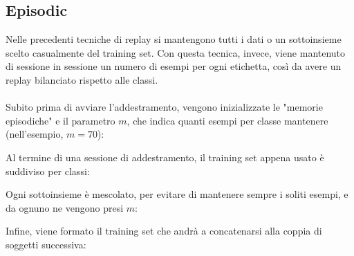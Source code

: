 \subsection{Episodic}  %
Nelle precedenti tecniche di replay si mantengono tutti i dati o un sottoinsieme scelto casualmente del training set. Con questa tecnica, invece, viene mantenuto di sessione in sessione un numero di esempi per ogni etichetta, così da avere un replay bilanciato rispetto alle classi.\\\\
Subito prima di avviare l'addestramento, vengono inizializzate le "memorie episodiche" e il parametro $m$, che indica quanti esempi per classe mantenere (nell'esempio, $m = 70$):

Al termine di una sessione di addestramento, il training set appena usato è suddiviso per classi:




Ogni sottoinsieme è mescolato, per evitare di mantenere sempre i soliti esempi, e da ognuno ne vengono presi $m$:




Infine, viene formato il training set che andrà a concatenarsi alla coppia di soggetti successiva:


